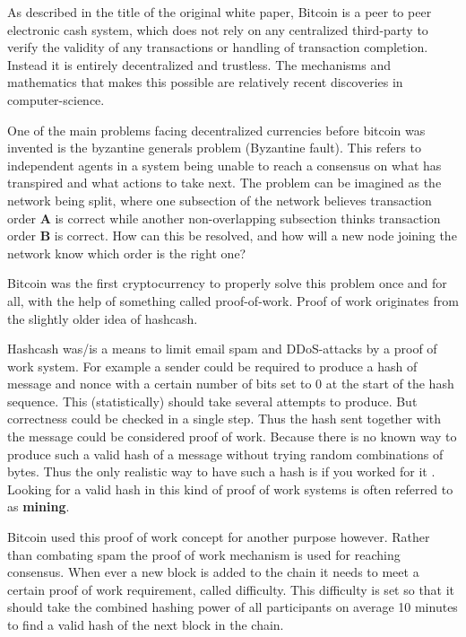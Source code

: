 As described in the title of the original white paper\cite{nakamoto_bitcoin}, Bitcoin is a peer to peer electronic cash system, which does not rely on any centralized third-party to verify the validity of any transactions or handling of transaction completion. Instead it is entirely decentralized and trustless. The mechanisms and mathematics that makes this possible are relatively recent discoveries in computer-science. 


One of the main problems facing decentralized currencies before bitcoin was invented is the byzantine generals problem (Byzantine fault)\cite{lamport_shostak_pease_1982}. This refers to independent agents in a system being unable to reach a consensus on what has transpired and what actions to take next. The problem can be imagined as the network being split, where one subsection of the network believes transaction order \textbf{A} is correct while another non-overlapping subsection thinks transaction order \textbf{B} is correct. How can this be resolved, and how will a new node joining the network know which order is the right one?

Bitcoin was the first cryptocurrency to properly solve this problem once and for all, with the help of something called proof-of-work. Proof of work originates from the slightly older idea of hashcash.\cite{hashcash}

Hashcash was/is a means to limit email spam and DDoS-attacks by a proof of work system. For example a sender could be required to produce a hash of message and nonce with a certain number of bits set to 0 at the start of the hash sequence. This (statistically) should take several attempts to produce. But correctness could be checked in a single step. Thus the hash sent together with the message could be considered proof of work. Because there is no known way to produce such a valid hash of a message without trying random combinations of bytes. Thus the only realistic way to have such a hash is if you worked for it \cite{hashcash}. Looking for a valid hash in this kind of proof of work systems is often referred to as \textbf{mining}.

Bitcoin used this proof of work concept for another purpose however. Rather than combating spam the proof of work mechanism is used for reaching consensus. When ever a new block is added to the chain it needs to meet a certain proof of work requirement, called difficulty. This difficulty is set so that it should take the combined hashing power of all participants on average 10 minutes to find a valid hash of the next block in the chain.\cite{nakamoto_bitcoin}\cite{antonopoulos_2017}

